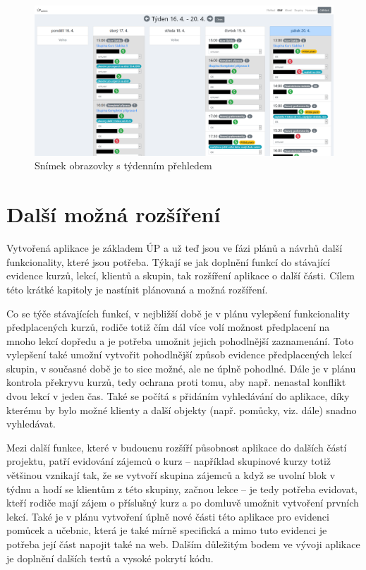         \begin{landscape}
            \begin{figure}\centering
            	\includegraphics[totalheight=0.83\textheight]{img/screenshoty/screen-tyden.png}
            	\caption{Snímek obrazovky s týdenním přehledem}\label{fig:screen-tyden}
            \end{figure}
        \end{landscape}
    

\chapter{Další možná rozšíření}\label{dalsirozsireni}
Vytvořená aplikace je základem ÚP a už teď jsou ve fázi plánů a návrhů další funkcionality, které jsou potřeba. Týkají se jak doplnění funkcí do stávající evidence kurzů, lekcí, klientů a skupin, tak rozšíření aplikace o další části. Cílem této krátké kapitoly je nastínit plánovaná a možná rozšíření.

Co se týče stávajících funkcí, v nejbližší době je v plánu vylepšení funkcionality předplacených kurzů, rodiče totiž čím dál více volí možnost předplacení na mnoho lekcí dopředu a je potřeba umožnit jejich pohodlnější zaznamenání. Toto vylepšení také umožní vytvořit pohodlnější způsob evidence předplacených lekcí skupin, v současné době je to sice možné, ale ne úplně pohodlné. Dále je v plánu kontrola překryvu kurzů, tedy ochrana proti tomu, aby např. nenastal konflikt dvou lekcí v jeden čas. Také se počítá s přidáním vyhledávání do aplikace, díky kterému by bylo možné klienty a další objekty (např. pomůcky, viz. dále) snadno vyhledávat.

Mezi další funkce, které v budoucnu rozšíří působnost aplikace do dalších částí projektu, patří evidování zájemců o kurz -- například skupinové kurzy totiž většinou vznikají tak, že se vytvoří skupina zájemců a když se uvolní blok v týdnu a hodí se klientům z této skupiny, začnou lekce -- je tedy potřeba evidovat, kteří rodiče mají zájem o příslušný kurz a po domluvě umožnit vytvoření prvních lekcí. Také je v plánu vytvoření úplně nové části této aplikace pro evidenci pomůcek a učebnic, která je také mírně specifická a mimo tuto evidenci je potřeba její část napojit také na web. Dalším důležitým bodem ve vývoji aplikace je doplnění dalších testů a vysoké pokrytí kódu.

